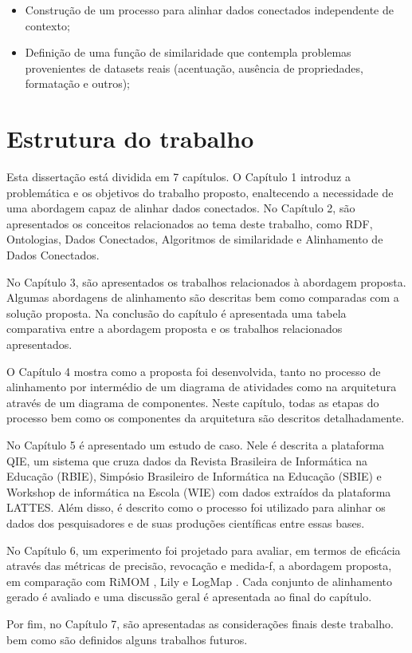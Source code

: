 \begin{itemize}
        \item Construção de um processo para alinhar dados conectados independente de contexto;
        \item Definição de uma função de similaridade que contempla problemas provenientes de datasets reais (acentuação, ausência de propriedades, formatação e outros);
\end{itemize}

\section{Estrutura do trabalho}

Esta dissertação está dividida em 7 capítulos. O Capítulo 1 introduz a problemática e os objetivos do trabalho proposto, enaltecendo a necessidade de uma abordagem capaz de alinhar dados conectados. No Capítulo 2, são apresentados os conceitos relacionados ao tema deste trabalho, como RDF, Ontologias, Dados Conectados, Algoritmos de similaridade e Alinhamento de Dados Conectados.

No Capítulo 3, são apresentados os trabalhos relacionados à abordagem proposta. Algumas abordagens de alinhamento são descritas bem como comparadas com a solução proposta. Na conclusão do capítulo é apresentada uma tabela comparativa entre a abordagem proposta e os trabalhos relacionados apresentados.

O Capítulo 4 mostra como a proposta foi desenvolvida, tanto no processo de alinhamento por intermédio de um diagrama de atividades como na arquitetura através de um diagrama de componentes. Neste capítulo, todas as etapas do processo bem como os componentes da arquitetura são descritos detalhadamente.

No Capítulo 5 é apresentado um estudo de caso. Nele é descrita a plataforma QIE, um sistema que cruza dados da Revista Brasileira de Informática na Educação (RBIE), Simpósio Brasileiro de Informática na Educação (SBIE) e Workshop de informática na Escola (WIE) com dados extraídos da plataforma LATTES. Além disso, é descrito como o processo foi utilizado para alinhar os dados dos pesquisadores e de suas produções científicas entre essas bases.

No Capítulo 6, um experimento foi projetado para avaliar, em termos de eficácia através das métricas de precisão, revocação e medida-f, a abordagem proposta, em comparação com RiMOM \cite{zhang2015rimom} , Lily \cite{wang2015lily} e LogMap \cite{jimenez2015logmap}. Cada conjunto de alinhamento gerado é avaliado e uma discussão geral é apresentada ao final do capítulo.

Por fim, no Capítulo 7, são apresentadas as considerações finais deste trabalho. bem como são definidos alguns trabalhos futuros.
